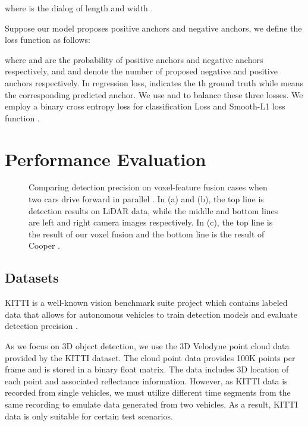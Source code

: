 \documentclass[sigconf]{acmart}
\begin{document}
where  is the dialog of length and width .

Suppose our model proposes  positive anchors and  negative anchors, we define the loss function as follows:

where  and  are the probability of positive anchors and negative anchors respectively, and  and  denote the number of proposed negative and positive anchors respectively. In regression loss,  indicates the th ground truth while  means the corresponding predicted anchor.  We use  and  to balance these three losses. We employ a binary cross entropy loss for classification Loss and Smooth-L1 loss function \cite{girshick2015fast,ren2015faster}.


\section{Performance Evaluation}
\begin{figure*}[!htbp]
\centering
\vspace{-11pt}
\vfill
\caption{Comparing detection precision on voxel-feature fusion cases when two cars drive forward in parallel . In (a) and (b), the top line is detection results on LiDAR data, while the middle and bottom lines are left and right camera images respectively. In (c), the top line is the result of our voxel fusion and the bottom line is the result of Cooper \cite{qi2019cooper}. }
\vspace{-5pt}
\label{fig:lidar_detect1}
\end{figure*}


\subsection{Datasets}

KITTI \cite{geiger2012we} is a well-known vision benchmark suite project which contains labeled data that allows for autonomous vehicles to train detection models and evaluate detection precision .

As we focus on 3D object detection, we use the 3D Velodyne point cloud data provided by the KITTI dataset. The cloud point data provides 100K points per frame and is stored in a binary float matrix. The data includes 3D location of each point and associated reflectance information.
However, as KITTI data is recorded from single vehicles, we must utilize different time segments from the same recording to emulate  data generated from two vehicles. As a result, KITTI data is only suitable for certain test scenarios.
\end{document}
